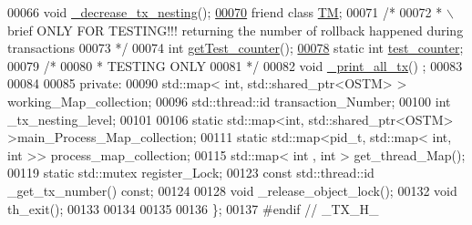 \begin{DoxyCode}
00066     \textcolor{keywordtype}{void} \hyperlink{class_t_x_aa3ac499f576326588628ade96b27b4b1}{\_decrease\_tx\_nesting}();
\hypertarget{_t_x_8h_source.tex_l00070}{}\hyperlink{class_t_x_adf1ccda799ef5c419cb43b8ae55eb45c}{00070}     \textcolor{keyword}{friend} \textcolor{keyword}{class }\hyperlink{class_t_m}{TM};
00071     \textcolor{comment}{/*}
00072 \textcolor{comment}{     * \(\backslash\)brief ONLY FOR TESTING!!! returning the number of rollback happened during transactions}
00073 \textcolor{comment}{     */}
00074     \textcolor{keywordtype}{int} \hyperlink{class_t_x_ae9bf97930c4670f59d334b345353a71e}{getTest\_counter}();
\hypertarget{_t_x_8h_source.tex_l00078}{}\hyperlink{class_t_x_a25838234aab99ae891a90eb8623a8b3c}{00078}     \textcolor{keyword}{static} \textcolor{keywordtype}{int} \hyperlink{class_t_x_a25838234aab99ae891a90eb8623a8b3c}{test\_counter};
00079     \textcolor{comment}{/*}
00080 \textcolor{comment}{     * TESTING ONLY}
00081 \textcolor{comment}{     */}
00082     \textcolor{keywordtype}{void} \hyperlink{class_t_x_a3d96ed91eb9ec73e16589f705661c5a7}{\_print\_all\_tx}() ;
00083 
00084 
00085 \textcolor{keyword}{private}:
00090     std::map< int, std::shared\_ptr<OSTM>  > working\_Map\_collection;
00096     std::thread::id transaction\_Number;
00100     \textcolor{keywordtype}{int} \_tx\_nesting\_level;
00101     
00106     \textcolor{keyword}{static} std::map<int, std::shared\_ptr<OSTM>  >main\_Process\_Map\_collection;
00111     \textcolor{keyword}{static} std::map<pid\_t, std::map< int, int >> process\_map\_collection;
00115     std::map< int , int > get\_thread\_Map();
00119     \textcolor{keyword}{static} std::mutex register\_Lock;
00123     \textcolor{keyword}{const} std::thread::id \_get\_tx\_number() \textcolor{keyword}{const};
00124    
00128     \textcolor{keywordtype}{void} \_release\_object\_lock();
00132     \textcolor{keywordtype}{void} th\_exit();
00133     
00134     
00135 
00136 \};
00137 \textcolor{preprocessor}{#endif // \_TX\_H\_}
\end{DoxyCode}
